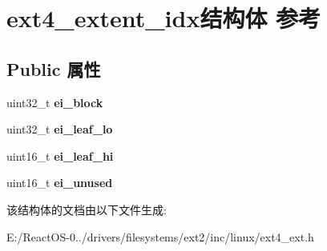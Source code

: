 \hypertarget{structext4__extent__idx}{}\section{ext4\+\_\+extent\+\_\+idx结构体 参考}
\label{structext4__extent__idx}
\subsection*{Public 属性}
\begin{DoxyCompactItemize}
\item 
\mbox{\label{structext4__extent__idx_addfeeb9da8f6856d72999e61c2690cb1}} 
uint32\+\_\+t {\bfseries ei\+\_\+block}
\item 
\mbox{\label{structext4__extent__idx_ac091d2027d89e976a5a883ce798ac89e}} 
uint32\+\_\+t {\bfseries ei\+\_\+leaf\+\_\+lo}
\item 
\mbox{\label{structext4__extent__idx_a77dd479a73a0541dad96bb0fe7e6cf6f}} 
uint16\+\_\+t {\bfseries ei\+\_\+leaf\+\_\+hi}
\item 
\mbox{\label{structext4__extent__idx_abb7d2b7b72d9c31d01208850c88683cd}} 
uint16\+\_\+t {\bfseries ei\+\_\+unused}
\end{DoxyCompactItemize}


该结构体的文档由以下文件生成\+:\begin{DoxyCompactItemize}
\item 
E\+:/\+React\+O\+S-\/0../drivers/filesystems/ext2/inc/linux/ext4\+\_\+ext.\+h\end{DoxyCompactItemize}
